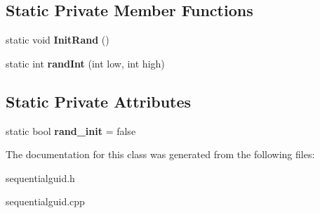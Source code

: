 \subsection*{Static Private Member Functions}
\begin{DoxyCompactItemize}
\item 
\mbox{\label{class_sequential_g_u_i_d_ac9cd3532db46758fd4bbe990857cf9d7}} 
static void {\bfseries Init\+Rand} ()
\item 
\mbox{\label{class_sequential_g_u_i_d_ad1613a94f41f66eff11b36f0110e824a}} 
static int {\bfseries rand\+Int} (int low, int high)
\end{DoxyCompactItemize}
\subsection*{Static Private Attributes}
\begin{DoxyCompactItemize}
\item 
\mbox{\label{class_sequential_g_u_i_d_a9744b485ad5921199796cc014b7cb831}} 
static bool {\bfseries rand\+\_\+init} = false
\end{DoxyCompactItemize}


The documentation for this class was generated from the following files\+:\begin{DoxyCompactItemize}
\item 
sequentialguid.\+h\item 
sequentialguid.\+cpp\end{DoxyCompactItemize}
